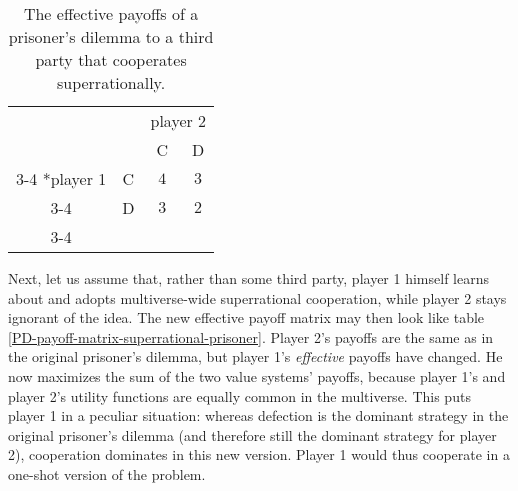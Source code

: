 \begin{table}[h!]
    \centering
    \setlength{\extrarowheight}{2pt}
    \begin{tabular}{cc|c|c|}
      & \multicolumn{1}{c}{} & \multicolumn{2}{c}{player 2}\\
      & \multicolumn{1}{c}{} & \multicolumn{1}{c}{C}  & \multicolumn{1}{c}{D} \\\cline{3-4}
      \multirow{2}*{player 1}  & C & $\,\,4\,\,$ & $3$ \\\cline{3-4}
      						   & D & $\,\,3\,\,$ & $2$ \\\cline{3-4}
    \end{tabular}
    \caption{The effective payoffs of a prisoner's dilemma to a third party that cooperates
superrationally.}
    \label{PD-payoff-matrix-superrational-third-party}
\end{table}

Next, let us assume that, rather than some third party, player 1 himself
learns about and adopts multiverse-wide superrational cooperation, while
player 2 stays ignorant of the idea. The new effective payoff matrix may
then look like table
\ref{PD-payoff-matrix-superrational-prisoner}. Player
2's payoffs are the same as in the original prisoner's dilemma, but
player 1's \emph{effective} payoffs have changed. He now maximizes the
sum of the two value systems' payoffs, because player 1's and player 2's
utility functions are equally common in the multiverse. This puts player
1 in a peculiar situation: whereas defection is the dominant strategy in
the original prisoner's dilemma (and therefore still the dominant
strategy for player 2), cooperation dominates in this new
version. Player 1 would thus cooperate in a one-shot
version of the problem.

